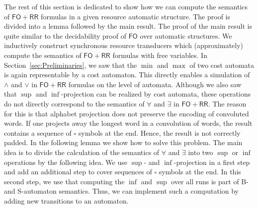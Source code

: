 \documentclass{LMCS}
\newcommand{\FO}{\ensuremath{\mathsf{FO}}}
\newcommand{\pad}{\square}
\newcommand{\FORR}{\ensuremath{\mathsf{FO\!\!+\!\!RR}}}
\begin{document}
The rest of this section is dedicated to show how we can compute the semantics
of \FORR{} formulas in a given resource automatic structure. The proof is
divided into a lemma followed by the main result. The proof of the main
result is quite similar to the decidability proof of \FO{} over automatic
structures. We inductively construct synchronous resource transducers which
(approximately) compute the semantics of \FORR{} formulas with free variables.
In Section~\ref{sec:Preliminaries}, we saw that the $\min$ and $\max$ of two
cost automata is again representable by a cost automaton. This directly
enables a simulation of $\wedge$ and $\vee$ in \FORR{} formulas on the level of
automata. Although we also saw that $\sup$ and $\inf$-projection can be realized
by cost automata, these operations do not directly correspond to the
semantics of $\forall$ and $\exists$ in \FORR{}. The reason for this is that
alphabet projection does not preserve the encoding of convoluted words. If one
projects away the longest word in a convolution of words, the result contains
a sequence of $\pad$ symbols at the end. Hence, the result is not correctly
padded. In the following lemma we show how to solve this problem.
The main idea
is to divide the calculation of the semantics of $\forall$ and $\exists$ into
two $\sup$ or $\inf$ operations by the following idea. We use
$\sup$- and $\inf$-projection in a first step and add an additional step to
cover sequences of $\pad$ symbols at the end. In this second step, we use that
computing the $\inf$ and $\sup$ over all runs is part of B- and S-automaton
semantics. Thus, we can implement such a computation by adding new transitions
to an automaton.
\end{document}
